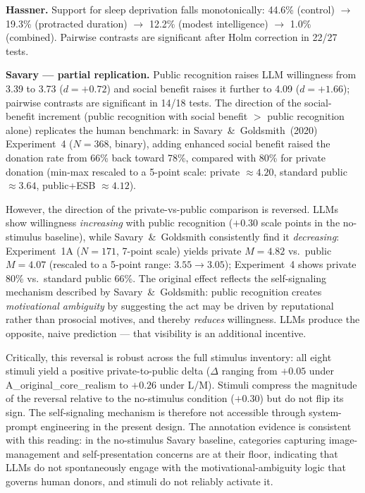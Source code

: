 \documentclass[14pt,a4paper]{extarticle}
\begin{document}
\textbf{Hassner.} Support for sleep deprivation falls monotonically: 44.6\% (control) $\to$ 19.3\% (protracted duration) $\to$ 12.2\% (modest intelligence) $\to$ 1.0\% (combined). Pairwise contrasts are significant after Holm correction in 22/27 tests.

\textbf{Savary --- partial replication.} Public recognition raises LLM willingness from 3.39 to 3.73 ($d = +0.72$) and social benefit raises it further to 4.09 ($d = +1.66$); pairwise contrasts are significant in 14/18 tests. The direction of the social-benefit increment (public recognition with social benefit $>$ public recognition alone) replicates the human benchmark: in Savary~\&~Goldsmith~(2020) Experiment~4 ($N = 368$, binary), adding enhanced social benefit raised the donation rate from 66\% back toward 78\%, compared with 80\% for private donation (min-max rescaled to a 5-point scale: private $\approx 4.20$, standard public $\approx 3.64$, public+ESB $\approx 4.12$).

However, the direction of the private-vs-public comparison is reversed. LLMs show willingness \emph{increasing} with public recognition ($+0.30$ scale points in the no-stimulus baseline), while Savary~\&~Goldsmith consistently find it \emph{decreasing}: Experiment~1A ($N = 171$, 7-point scale) yields private $M = 4.82$ vs.\ public $M = 4.07$ (rescaled to a 5-point range: $3.55 \to 3.05$); Experiment~4 shows private 80\% vs.\ standard public 66\%. The original effect reflects the self-signaling mechanism described by Savary~\&~Goldsmith: public recognition creates \emph{motivational ambiguity} by suggesting the act may be driven by reputational rather than prosocial motives, and thereby \emph{reduces} willingness. LLMs produce the opposite, naive prediction --- that visibility is an additional incentive.

Critically, this reversal is robust across the full stimulus inventory: all eight stimuli yield a positive private-to-public delta ($\Delta$ ranging from $+0.05$ under A\_original\_core\_realism to $+0.26$ under L/M). Stimuli compress the magnitude of the reversal relative to the no-stimulus condition ($+0.30$) but do not flip its sign. The self-signaling mechanism is therefore not accessible through system-prompt engineering in the present design. The annotation evidence is consistent with this reading: in the no-stimulus Savary baseline, categories capturing image-management and self-presentation concerns are at their floor, indicating that LLMs do not spontaneously engage with the motivational-ambiguity logic that governs human donors, and stimuli do not reliably activate it.
\end{document}
